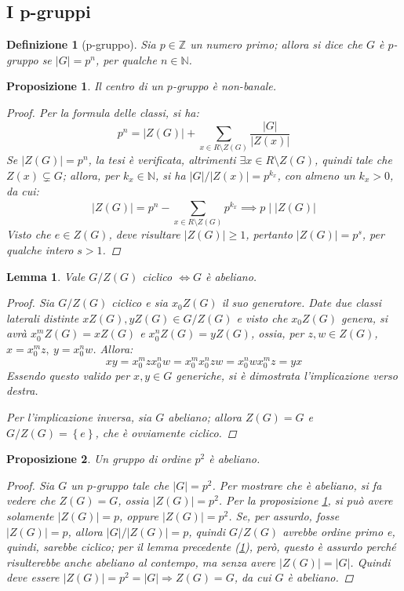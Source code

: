 \documentclass[12pt]{scrartcl}
\theoremstyle{style}
\newtheorem{definizione}{Definizione}[section]
\newtheorem{prop}{Proposizione}[section]
\newtheorem{lemma}{Lemma}[teorema]
\numberwithin{equation}{subsection}
\begin{document}
\subsection{I p-gruppi}
\begin{definizione}
	[p-gruppo]
	Sia $p \in \mathbb{Z}$ un numero primo; allora si dice che $G$ \`e $p$-gruppo se $\lvert G \rvert = p^n$, per qualche $n \in \mathbb{N}$.
\end{definizione}
\begin{prop}\label{pnb}
	Il centro di un $p$-gruppo \`e non-banale.
	\begin{proof}
		Per la formula delle classi, si ha:
		\[
		p^n = \lvert Z(G) \rvert  + \sum_{x \in R \setminus Z(G)}^{} \frac{\lvert G \rvert }{\lvert Z(x) \rvert }
		\] 
		Se $\lvert Z(G) \rvert  = p^n$, la tesi \`e verificata, altrimenti $\exists x \in R \setminus Z(G)$, quindi tale che $Z(x) \subsetneq G$; allora, per $k_x\in \mathbb{N}$, si ha $\lvert G \rvert / \lvert Z(x) \rvert = p^{k_x} $, con almeno un $k_x > 0$, da cui:
		\[
		\lvert Z(G) \rvert =p^n - \sum_{x \in R \setminus Z(G)}^{} p^{k_x} \implies p  \mid \lvert Z(G) \rvert 
		\] 
		Visto che $e \in Z(G)$, deve risultare $\lvert Z(G) \rvert \ge 1$, pertanto $\lvert Z(G) \rvert = p^s$, per qualche intero $s > 1$.
	\end{proof}
\end{prop} 
\begin{lemma}\label{GZGciffban}
	Vale $G / Z(G)$ ciclico $\iff G$ \`e abeliano.
	\begin{proof}
		Sia $G / Z(G)$ ciclico e sia $x_0 Z(G)$ il suo generatore.
		Date due classi laterali distinte $xZ(G), yZ(G) \in G / Z(G)$ e visto che $x_0Z(G)$ genera, si avr\`a $x_0^m Z(G)= x Z(G)$ e $x_0^nZ(G) = yZ(G)$, ossia, per $z,w \in Z(G)$, $x = x_0^m z,\ y = x_0^n w$. 
		Allora:
		\[
			 xy = x_0^m z x_0^n w = x_0^m x_0^n zw = x_0^n wx_0^m z = yx
		\] 
	Essendo questo valido per $x,y \in G$ generiche, si \`e dimostrata l'implicazione verso destra.

	Per l'implicazione inversa, sia $G$ abeliano; allora $Z(G) = G$ e $G / Z(G) = \left\{ e \right\} $, che \`e ovviamente ciclico.
	\end{proof}
\end{lemma}
\begin{prop}
	Un gruppo di ordine $p^2$ \`e abeliano.
	\begin{proof}
		Sia $G$ un $p$-gruppo tale che $\lvert G \rvert  = p^2$. Per mostrare che \`e abeliano, si fa vedere che $Z(G) = G$, ossia $\lvert Z(G) \rvert  = p^2$.
		Per la proposizione \ref{pnb}, si pu\`o avere solamente $\lvert Z(G) \rvert = p$, oppure $\lvert Z(G) \rvert = p ^2$.
		Se, per assurdo, fosse $\lvert Z(G) \rvert =p$, allora $\lvert G \rvert / \lvert Z(G) \rvert = p$, quindi $G / Z(G)$ avrebbe ordine primo e, quindi, sarebbe ciclico; per il lemma precedente (\ref{GZGciffban}), per\`o, questo \`e assurdo perch\'e risulterebbe anche abeliano al contempo, ma senza avere $\lvert Z(G) \rvert  = \lvert G \rvert $.
		Quindi deve essere $\lvert Z(G) \rvert  = p^2 = \lvert G \rvert \Rightarrow Z(G) = G$, da cui $G$ \`e abeliano.
	\end{proof}
\end{prop}
\end{document}

